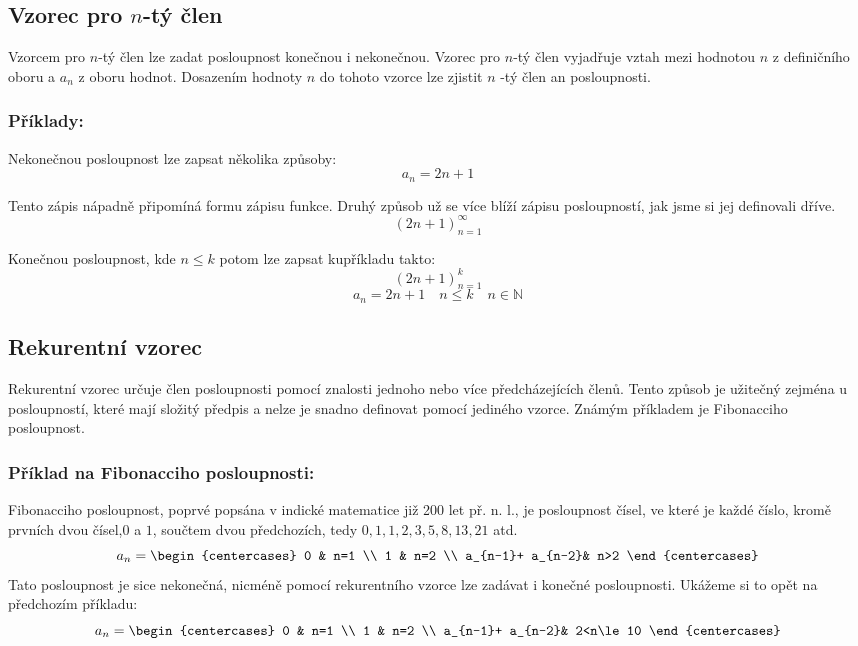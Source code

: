 \documentclass[12pt]{report}			%
\begin{document}
\subsection{Vzorec pro $n$-tý člen}
Vzorcem pro $n$-tý člen lze zadat posloupnost konečnou i nekonečnou.
Vzorec pro $n$-tý člen vyjadřuje vztah mezi hodnotou $n$ z definičního oboru a $a_n$ z oboru hodnot. Dosazením hodnoty $n$ do tohoto vzorce lze zjistit $n$ -tý člen an posloupnosti.
\subsubsection{Příklady:}
Nekonečnou posloupnost lze zapsat několika způsoby:
\[a_n = 2n + 1 \]

Tento zápis nápadně připomíná formu zápisu funkce. Druhý způsob už se více blíží zápisu posloupností, jak jsme si jej definovali dříve.
\[(2n + 1)_{n=1}^{\infty} \]

Konečnou posloupnost, kde $n \le k$ potom lze zapsat kupříkladu takto:
\[(2n + 1)_{n=1}^{k} \]
\[a_n = 2n + 1 \quad n \le k \quad n \in \mathbb{N}\]
\subsection{Rekurentní vzorec}
Rekurentní vzorec určuje člen posloupnosti pomocí znalosti jednoho nebo více předcházejících členů. Tento způsob je užitečný zejména u posloupností, které mají složitý předpis a nelze je snadno definovat pomocí jediného vzorce. Známým příkladem je Fibonacciho posloupnost.
\subsubsection{Příklad na Fibonacciho posloupnosti:}
Fibonacciho posloupnost, poprvé popsána v indické matematice již 200 let př. n. l., je posloupnost čísel, ve které je každé číslo, kromě prvních dvou čísel,$0$ a $1$, součtem dvou předchozích, tedy $0, 1, 1, 2, 3, 5, 8, 13, 21$ atd. 
\[
a_{n}=
\begin{centercases}
  0         & n=1 \\
  1 		   & n=2 \\
  a_{n-1}+ a_{n-2}& n>2
\end{centercases}
\]
Tato posloupnost je sice nekonečná, nicméně pomocí rekurentního vzorce lze zadávat i konečné posloupnosti. Ukážeme si to opět na předchozím příkladu:
\[
a_{n}=
\begin{centercases}
  0         & n=1 \\
  1 		   & n=2 \\
  a_{n-1}+ a_{n-2}& 2<n\le10
\end{centercases}
\]
\end{document}
